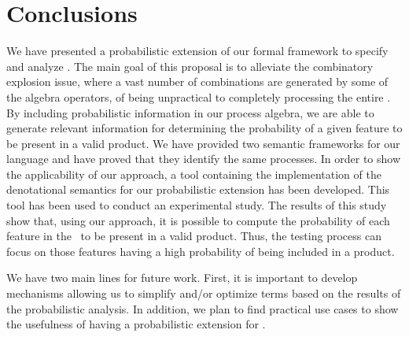 \section{Conclusions}
\label{section:jstat:concs}

We have presented a probabilistic extension of our
formal framework to specify and analyze \SPLs. The main goal of this
proposal is to alleviate the combinatory explosion issue, where a vast
number of combinations are generated by some of the algebra operators,
of being unpractical to completely processing the entire \SPL. By including probabilistic information in our process algebra, we are able to generate relevant information for determining the probability
of a given feature to be present in a valid product. We have provided two semantic frameworks for our language and have proved that they identify the same processes.
%
In order to show the applicability of our approach, a tool containing the
implementation of the denotational semantics for our probabilistic extension
has been developed. This tool has been used to conduct an experimental study.
%
The results of this study show that, using our approach, it is possible to compute
the probability of each feature in the \SPL\ to be present in a valid product.
Thus, the testing process can focus on those features having a high probability
of being included in a product.
  


%
%
%
%
We have two main lines for future work. First, it is important to develop 
mechanisms allowing us to simplify and/or optimize terms
based on the results of the probabilistic analysis. In addition, 
we plan to find practical use cases to show the usefulness of having a probabilistic extension for \SPLs.



